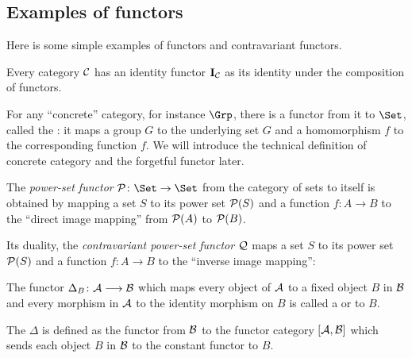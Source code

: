 \subsection{Examples of functors}
  Here is some simple examples of functors and contravariant functors.
  \begin{exam}
    Every category ${\cal C}$ has an identity functor $\operatorname{\mathbf{I}}_{{\cal C}}$ as its identity under the composition of functors. 
  \end{exam}
  \begin{exam}
    For any ``concrete'' category, for instance $\Grp$, there is a functor from it to $\Set$, called the : it maps a group $G$ to the underlying set $G$ and a homomorphism $f$ to the corresponding function $f$. We will introduce the technical definition of concrete category and the forgetful functor later.
  \end{exam}
  \begin{exam}  
    The \emph{power-set functor} $\Pp\colon\Set\to\Set$ from the category of sets to itself is obtained by mapping a set $S$ to its power set ${\cal P}(S)$ and a function $f\colon A\to B$ to the ``direct image mapping'' from ${\cal P}(A)$ to ${\cal P}(B)$.

    Its duality, the \emph{contravariant power-set functor} ${\cal Q}$ maps a set $S$ to its power set ${\cal P}(S)$ and a function $f\colon A\to B$ to the ``inverse image mapping'':
  \end{exam}
  \begin{exam}
    The functor $\Delta_B\colon{\cal A} \longrightarrow {\cal B}$ which maps every object of ${\cal A}$ to a fixed object $B$ in ${\cal B}$ and every morphism in ${\cal A}$ to the identity morphism on $B$ is called a  or  to $B$.
  \end{exam}
  \begin{exam}
    The  $\Delta$ is defined as the functor from ${\cal B}$ to the functor category $[{\cal A},{\cal B}]$ which sends each object $B$ in ${\cal B}$ to the constant functor to $B$.
  \end{exam}
